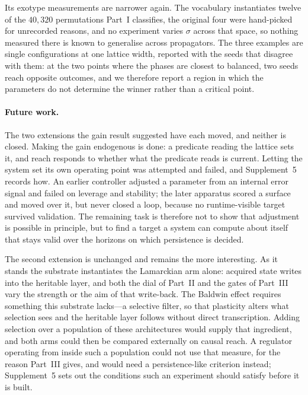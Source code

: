 \documentclass[man,12pt,floatsintext,donotrepeattitle]{apa7}
\newcommand{\sig}{\sigma}
\begin{document}
Its exotype measurements are narrower again. The vocabulary instantiates twelve of the
$40{,}320$ permutations Part~I classifies, the original four were hand-picked for
unrecorded reasons, and no experiment varies $\sig$ across that space, so nothing measured
there is known to generalise across propagators. The three examples are single
configurations at one lattice width, reported with the seeds that disagree with them: at
the two points where the phases are closest to balanced, two seeds reach opposite outcomes,
and we therefore report a region in which the parameters do not determine the winner rather
than a critical point.

\paragraph{Future work.} The two extensions the gain result suggested have each moved,
and neither is closed. Making the gain endogenous is done: a predicate reading the lattice
sets it, and reach responds to whether what the predicate reads is current. Letting the
system set its own operating point was attempted and failed, and Supplement~5 records how.
An earlier controller adjusted a parameter from an internal error signal and failed on
leverage and stability; the later apparatus scored a surface and moved over it, but never
closed a loop, because no runtime-visible target survived validation. The remaining task is
therefore not to show that adjustment is possible in principle, but to find a target a
system can compute about itself that stays valid over the horizons on which persistence is
decided.

The second extension is unchanged and remains the more interesting. As it stands the
substrate instantiates the Lamarckian arm alone: acquired state writes into the
heritable layer, and both the dial of Part~II and the gates of Part~III vary the
strength or the aim of that write-back. The Baldwin effect requires something this
substrate lacks---a selective filter, so that plasticity alters what selection sees and
the heritable layer follows without direct transcription. Adding selection over a
population of these architectures would supply that ingredient, and both arms could then
be compared externally on causal reach. A regulator operating from inside such a
population could not use that measure, for the reason Part~III gives, and would need a
persistence-like criterion instead; Supplement~5 sets out the conditions such an
experiment should satisfy before it is built.
\end{document}
